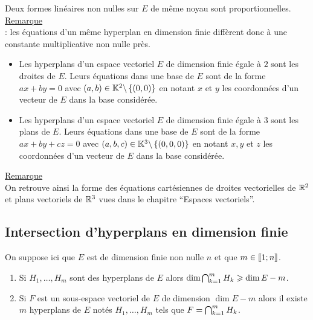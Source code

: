 \begin{defprop}
    Deux formes linéaires non nulles sur \(E\) de même noyau sont proportionnelles.\\
    \underline{Remarque}\\ : 
    les équations d’un même hyperplan en dimension finie diffèrent donc à une constante multiplicative non nulle près.
\end{defprop}

\begin{defprop}
    \begin{itemize}
        \item Les hyperplans d’un espace vectoriel \(E\) de dimension finie égale à \(2\) sont les droites de \(E\). Leurs équations dans une base de \(E\) sont de la forme \(ax + by = 0\) avec \((a, b) \in  \mathbb{K}^2 \backslash \left\lbrace(0, 0)\right\rbrace\) en notant \(x\) et \(y\) les coordonnées d’un vecteur de \(E\) dans la base considérée.
        \item Les hyperplans d’un espace vectoriel \(E\) de dimension finie égale à \(3\) sont les plans de \(E\). Leurs équations dans une base de \(E\) sont de la forme \(ax + by + cz = 0\) avec \((a, b, c) \in  \mathbb{K}^3 \backslash \left\lbrace(0, 0, 0)\right\rbrace\) en notant \(x, y\) et \(z\) les coordonnées d’un vecteur de \(E\) dans la base considérée.
    \end{itemize}
    \underline{Remarque}\\
    On retrouve ainsi la forme des équations cartésiennes de droites vectorielles de \(\mathbb{R}^2\) et plans vectoriels de \(\mathbb{R}^3\) vues dans le chapitre “Espaces vectoriels”.
\end{defprop}
\subsection{Intersection d’hyperplans en dimension finie}
    On suppose ici que \(E\) est de dimension finie non nulle \(n\) et que \(m \in \left\llbracket1;n\right\rrbracket\).

\begin{theo}
    \begin{enumerate}
        \item Si \(H_1, \dots , H_m\) sont des hyperplans de \(E\) alors \(\dim \bigcap^{m}_{k=1}H_k \geqslant \dim E - m\).
        \item Si \(F\) est un sous-espace vectoriel de \(E\) de dimension \(\dim E - m\) alors il existe \(m\) hyperplans de \(E\) notés \(H_1, \dots , H_m\) tels que \(F =\bigcap^m_{k=1}H_k\).
    \end{enumerate}
\end{theo}

